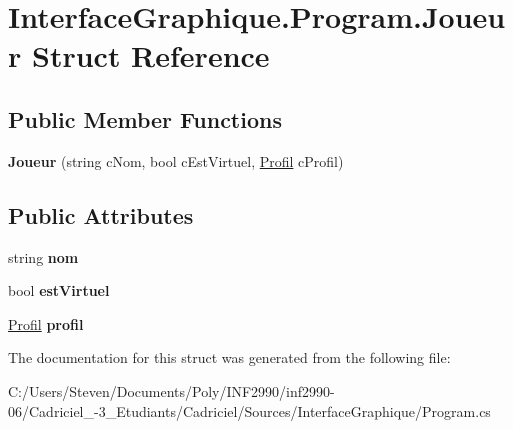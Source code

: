 \hypertarget{struct_interface_graphique_1_1_program_1_1_joueur}{}\section{Interface\+Graphique.\+Program.\+Joueur Struct Reference}
\label{struct_interface_graphique_1_1_program_1_1_joueur}
\subsection*{Public Member Functions}
\begin{DoxyCompactItemize}
\item 
\hypertarget{struct_interface_graphique_1_1_program_1_1_joueur_aaf155cedd23600e18f16c434489eb534}{}\label{struct_interface_graphique_1_1_program_1_1_joueur_aaf155cedd23600e18f16c434489eb534} 
{\bfseries Joueur} (string c\+Nom, bool c\+Est\+Virtuel, \hyperlink{struct_interface_graphique_1_1_profil}{Profil} c\+Profil)
\end{DoxyCompactItemize}
\subsection*{Public Attributes}
\begin{DoxyCompactItemize}
\item 
\hypertarget{struct_interface_graphique_1_1_program_1_1_joueur_ad063811f744eed615e20751876026835}{}\label{struct_interface_graphique_1_1_program_1_1_joueur_ad063811f744eed615e20751876026835} 
string {\bfseries nom}
\item 
\hypertarget{struct_interface_graphique_1_1_program_1_1_joueur_ad6f62d644a74c223dd80d1da000166d5}{}\label{struct_interface_graphique_1_1_program_1_1_joueur_ad6f62d644a74c223dd80d1da000166d5} 
bool {\bfseries est\+Virtuel}
\item 
\hypertarget{struct_interface_graphique_1_1_program_1_1_joueur_a70160134dded79a4a0fe5ef577ed4875}{}\label{struct_interface_graphique_1_1_program_1_1_joueur_a70160134dded79a4a0fe5ef577ed4875} 
\hyperlink{struct_interface_graphique_1_1_profil}{Profil} {\bfseries profil}
\end{DoxyCompactItemize}


The documentation for this struct was generated from the following file\+:\begin{DoxyCompactItemize}
\item 
C\+:/\+Users/\+Steven/\+Documents/\+Poly/\+I\+N\+F2990/inf2990-\/06/\+Cadriciel\+\_-\/3\+\_\+\+Etudiants/\+Cadriciel/\+Sources/\+Interface\+Graphique/Program.\+cs\end{DoxyCompactItemize}
